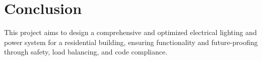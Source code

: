 \documentclass[a4paper,12pt]{article}
\begin{document}
\section{Conclusion}
This project aims to design a comprehensive and optimized electrical lighting and power system for a residential building, ensuring functionality and future-proofing through safety, load balancing, and code compliance.
\end{document}
